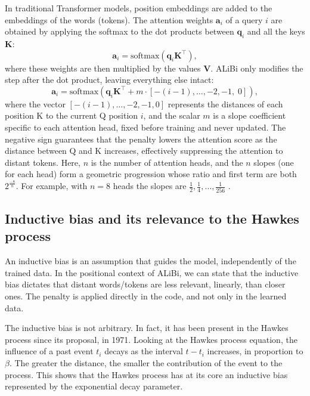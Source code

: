 In traditional Transformer models, position embeddings are added to the embeddings of the words (tokens). The attention weights $\mathbf{a}_i$ of a query $i$ are obtained by applying the softmax to the dot products between $\mathbf{q}_i$ and all the keys $\mathbf{K}$:
\begin{equation}
    \mathbf{a}_i = \text{softmax}\!\left(\mathbf{q}_i \mathbf{K}^\top\right),
\end{equation}
where these weights are then multiplied by the values $\mathbf{V}$. ALiBi only modifies the step after the dot product, leaving everything else intact:
\begin{equation}
    \mathbf{a}_i = \text{softmax}\!\left(\mathbf{q}_i \mathbf{K}^\top + m \cdot \left[-(i-1), \ldots, -2,-1,\; 0\right]\right),
    \label{eq:alibi}
\end{equation}
where the vector $[-(i-1), \ldots, -2, -1, 0]$ represents the distances of each position K to the current Q position $i$, and the scalar $m$ is a slope coefficient specific to each attention head, fixed before training and never updated. The negative sign guarantees that the penalty lowers the attention score as the distance between Q and K increases, effectively suppressing the attention to distant tokens. Here, $n$ is the number of attention heads, and the $n$ slopes (one for each head) form a geometric progression whose ratio and first term are both ${2^{\frac{-8}{n}}}$. For example, with $n = 8$ heads the slopes are $\frac{1}{2}, \frac{1}{4}, \ldots, \frac{1}{256}$ \cite{press_train_2021}.

\subsection{Inductive bias and its relevance to the Hawkes process}
\label{subsec:inductive-bias-hawkes}

An inductive bias is an assumption that guides the model, independently of the trained data. In the positional context of ALiBi, we can state that the inductive bias dictates that distant words/tokens are less relevant, linearly, than closer ones. The penalty is applied directly in the code, and not only in the learned data.

The inductive bias is not arbitrary. In fact, it has been present in the Hawkes process since its proposal, in 1971. Looking at the Hawkes process equation, the influence of a past event $t_i$ decays as the interval $t - t_i$ increases, in proportion to $\beta$. The greater the distance, the smaller the contribution of the event to the process. This shows that the Hawkes process has at its core an inductive bias represented by the exponential decay parameter.

